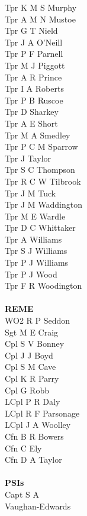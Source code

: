 \begin{multicols}{4}
  Tpr K M S Murphy \\
  Tpr A M N Mustoe \\
  Tpr G T Nield \\
  Tpr J A O'Neill \\
  Tpr P F Parnell \\
  Tpr M J Piggott \\
  Tpr A R Prince \\
  Tpr I A Roberts \\
  Tpr P B Ruscoe \\
  Tpr D Sharkey \\
  Tpr A E Short \\
  Tpr M A Smedley \\
  Tpr P C M Sparrow \\
  Tpr J Taylor \\
  Tpr S C Thompson \\
  Tpr R C W Tilbrook \\
  Tpr J M Tuck \\
  Tpr J M Waddington \\
  Tpr M E Wardle \\
  Tpr D C Whittaker \\
  Tpr A Williams \\
  Tpr S J Williams \\
  Tpr P J Williams \\
  Tpr P J Wood \\
  Tpr F R Woodington \\
  \\
  \textbf{REME} \\
  WO2 R P Seddon \\
  Sgt M E Craig \\
  Cpl S V Bonney \\
  Cpl J J Boyd \\
  Cpl S M Cave \\
  Cpl K R Parry \\
  Cpl G Robb \\
  LCpl P R Daly \\
  LCpl R F Parsonage \\
  LCpl J A Woolley \\
  Cfn B R Bowers \\
  Cfn C Ely \\
  Cfn D A Taylor \\
  \\
  \textbf{PSIs} \\
  Capt S A  \\ \indent Vaughan-Edwards \\

\end{multicols}
